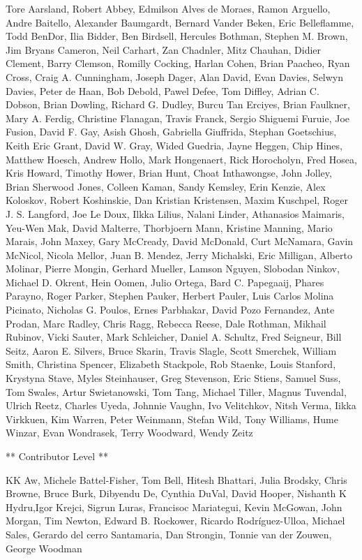 \documentclass[]{memoir}
\begin{document}
Tore Aarsland, Robert Abbey, Edmilson Alves de Moraes, Ramon Arguello,
Andre Baitello, Alexander Baumgardt, Bernard Vander Beken, Eric
Belleflamme, Todd BenDor, Ilia Bidder, Ben Birdsell, Hercules Bothman,
Stephen M. Brown, Jim Bryans Cameron, Neil Carhart, Zan Chadnler, Mitz
Chauhan, Didier Clement, Barry Clemson, Romilly Cocking, Harlan Cohen,
Brian Paacheo, Ryan Cross, Craig A. Cunningham, Joseph Dager, Alan
David, Evan Davies, Selwyn Davies, Peter de Haan, Bob Debold, Pawel
Defee, Tom Diffley, Adrian C. Dobson, Brian Dowling, Richard G. Dudley,
Burcu Tan Erciyes, Brian Faulkner, Mary A. Ferdig, Christine Flanagan,
Travis Franck, Sergio Shiguemi Furuie, Joe Fusion, David F. Gay, Asish
Ghosh, Gabriella Giuffrida, Stephan Goetschius, Keith Eric Grant, David
W. Gray, Wided Guedria, Jayne Heggen, Chip Hines, Matthew Hoesch, Andrew
Hollo, Mark Hongenaert, Rick Horocholyn, Fred Hosea, Kris Howard,
Timothy Hower, Brian Hunt, Choat Inthawongse, John Jolley, Brian
Sherwood Jones, Colleen Kaman, Sandy Kemsley, Erin Kenzie, Alex
Koloskov, Robert Koshinskie, Dan Kristian Kristensen, Maxim Kuschpel,
Roger J. S. Langford, Joe Le Doux, Ilkka Lilius, Nalani Linder,
Athanasios Maimaris, Yeu-Wen Mak, David Malterre, Thorbjoern Mann,
Kristine Manning, Mario Marais, John Maxey, Gary McCready, David
McDonald, Curt McNamara, Gavin McNicol, Nicola Mellor, Juan B. Mendez,
Jerry Michalski, Eric Milligan, Alberto Molinar, Pierre Mongin, Gerhard
Mueller, Lamson Nguyen, Slobodan Ninkov, Michael D. Okrent, Hein Oomen,
Julio Ortega, Bard C. Papegaaij, Phares Parayno, Roger Parker, Stephen
Pauker, Herbert Pauler, Luis Carlos Molina Picinato, Nicholas G. Poulos,
Ernes Parbhakar, David Pozo Fernandez, Ante Prodan, Marc Radley, Chris
Ragg, Rebecca Reese, Dale Rothman, Mikhail Rubinov, Vicki Sauter, Mark
Schleicher, Daniel A. Schultz, Fred Seigneur, Bill Seitz, Aaron E.
Silvers, Bruce Skarin, Travis Slagle, Scott Smerchek, William Smith,
Christina Spencer, Elizabeth Stackpole, Rob Staenke, Louis Stanford,
Krystyna Stave, Myles Steinhauser, Greg Stevenson, Eric Stiens, Samuel
Suss, Tom Swales, Artur Swietanowski, Tom Tang, Michael Tiller, Magnus
Tuvendal, Ulrich Reetz, Charles Uyeda, Johnnie Vaughn, Ivo Velitchkov,
Nitsh Verma, Iikka Virkkuen, Kim Warren, Peter Weinmann, Stefan Wild,
Tony Williams, Hume Winzar, Evan Wondrasek, Terry Woodward, Wendy Zeitz

** Contributor Level **

KK Aw, Michele Battel-Fisher, Tom Bell, Hitesh Bhattari, Julia Brodsky,
Chris Browne, Bruce Burk, Dibyendu De, Cynthia DuVal, David Hooper,
Nishanth K Hydru,Igor Krejci, Sigrun Luras, Francisoc Mariategui, Kevin
McGowan, John Morgan, Tim Newton, Edward B. Rockower, Ricardo
Rodríguez-Ulloa, Michael Sales, Gerardo del cerro Santamaria, Dan
Strongin, Tonnie van der Zouwen, George Woodman
\end{document}
